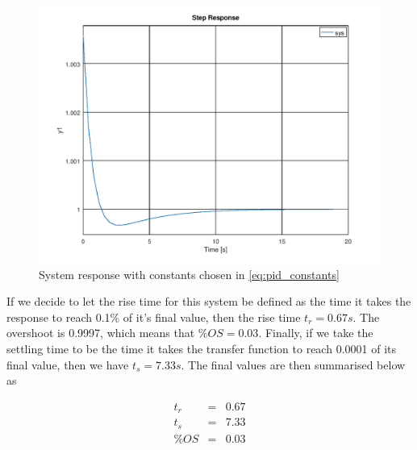 \documentclass[a4paper, 12pt]{article}
\begin{document}
\begin{figure}[H]
	\centering
	\includegraphics[width=\textwidth]{response.png}
	\caption{System response with constants chosen in \eqref{eq:pid_constants}}
	\label{fig:response}
\end{figure}

If we decide to let the rise time for this system be defined as the time it
takes the response to reach 0.1\% of it's final value, then the rise time $t_r
= 0.67s$. The overshoot is 0.9997, which means that $\%OS = 0.03$. Finally, if
we take the settling time to be the time it takes the transfer function to
reach 0.0001 of its final value, then we have $t_s = 7.33s$. The final values
are then summarised below as

\begin{equation}
  \begin{array}{rcl}
    t_r & = & 0.67 \\
    t_s & = & 7.33 \\
    \%OS & = & 0.03 \\
  \end{array}
  \label{eq:finalstats}
\end{equation}

\end{document}
